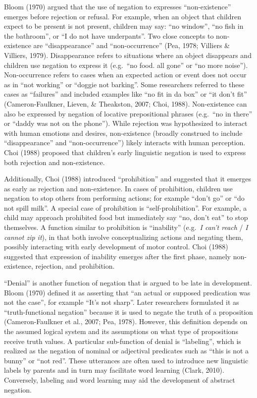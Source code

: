 \documentclass[
  english,
  man,floatsintext]{apa6}
\begin{document}
Bloom (1970) argued that the use of negation to expresses \enquote{non-existence} emerges before rejection or refusal. For example, when an object that children expect to be present is not present, children may say: \enquote{no window}, \enquote{no fish in the bathroom}, or \enquote{I do not have underpants}. Two close concepts to non-existence are \enquote{disappearance} and \enquote{non-occurrence} (Pea, 1978; Villiers \& Villiers, 1979). Disappearance refers to situations where an object disappears and children use negation to express it (e.g.~\enquote{no food. all gone} or \enquote{no more noise}). Non-occurrence refers to cases when an expected action or event does not occur as in \enquote{not working} or \enquote{doggie not barking}. Some researchers referred to these cases as \enquote{failures} and included examples like \enquote{no fit in da box} or \enquote{it don't fit} (Cameron-Faulkner, Lieven, \& Theakston, 2007; Choi, 1988). Non-existence can also be expressed by negation of locative prepositional phrases (e.g.~\enquote{no in there} or \enquote{daddy was not on the phone}). While rejection was hypothesized to interact with human emotions and desires, non-existence (broadly construed to include \enquote{disappearance} and \enquote{non-occurrence}) likely interacts with human perception. Choi (1988) proposed that children's early linguistic negation is used to express both rejection and non-existence.

Additionally, Choi (1988) introduced \enquote{prohibition} and suggested that it emerges as early as rejection and non-existence. In cases of prohibition, children use negation to stop others from performing actions; for example \enquote{don't go} or \enquote{do not spill milk}. A special case of prohibition is \enquote{self-prohibition}. For example, a child may approach prohibited food but immediately say \enquote{no, don't eat} to stop themselves. A function similar to prohibition is \enquote{inability} (e.g.~\emph{I can't reach} / \emph{I cannot zip it}), in that both involve conceptualizing actions and negating them, possibly interacting with early development of motor control. Choi (1988) suggested that expression of inability emerges after the first phase, namely non-existence, rejection, and prohibition.

\enquote{Denial} is another function of negation that is argued to be late in development. Bloom (1970) defined it as asserting that \enquote{an actual or supposed predication was not the case}, for example \enquote{It's not sharp}. Later researchers formulated it as \enquote{truth-functional negation} because it is used to negate the truth of a proposition (Cameron-Faulkner et al., 2007; Pea, 1978). However, this definition depends on the assumed logical system and its assumptions on what type of propositions receive truth values. A particular sub-function of denial is \enquote{labeling}, which is realized as the negation of nominal or adjectival predicates such as \enquote{this is not a bunny} or \enquote{not red}. These utterances are often used to introduce new linguistic labels by parents and in turn may facilitate word learning (Clark, 2010). Conversely, labeling and word learning may aid the development of abstract negation.
\end{document}
